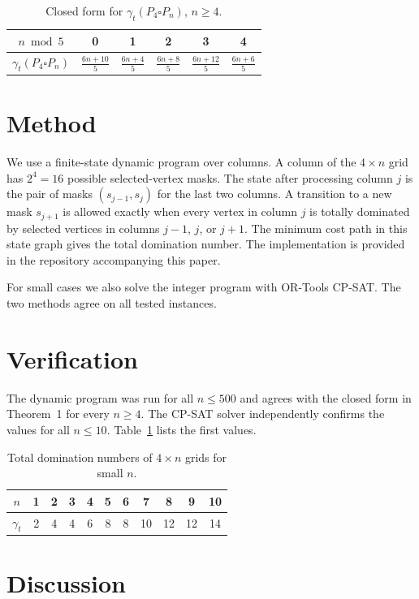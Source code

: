 \documentclass[11pt]{article}
\begin{document}
\begin{table}[h]
\centering
\begin{tabular}{c|c|c|c|c|c}
$n \bmod 5$ & 0 & 1 & 2 & 3 & 4\\
\hline
$\gamma_t(P_4 \square P_n)$ & $\frac{6n+10}{5}$ & $\frac{6n+4}{5}$ & $\frac{6n+8}{5}$ & $\frac{6n+12}{5}$ & $\frac{6n+6}{5}$
\end{tabular}
\caption{Closed form for $\gamma_t(P_4 \square P_n)$, $n \ge 4$.}
\end{table}

\section{Method}

We use a finite-state dynamic program over columns. A column of the $4 \times n$ grid
has $2^4=16$ possible selected-vertex masks. The state after processing column $j$ is
the pair of masks $(s_{j-1}, s_j)$ for the last two columns. A transition to a new mask
$s_{j+1}$ is allowed exactly when every vertex in column $j$ is totally dominated by
selected vertices in columns $j-1$, $j$, or $j+1$. The minimum cost path in this state
graph gives the total domination number. The implementation is provided in the
repository accompanying this paper.

For small cases we also solve the integer program with OR-Tools CP-SAT. The two methods
agree on all tested instances.

\section{Verification}

The dynamic program was run for all $n \le 500$ and agrees with the closed form in
Theorem~1 for every $n \ge 4$. The CP-SAT solver independently confirms the values for
all $n \le 10$. Table~\ref{tab:values} lists the first values.

\begin{table}[h]
\centering
\begin{tabular}{c|cccccccccc}
$n$ & 1 & 2 & 3 & 4 & 5 & 6 & 7 & 8 & 9 & 10\\
\hline
$\gamma_t$ & 2 & 4 & 4 & 6 & 8 & 8 & 10 & 12 & 12 & 14
\end{tabular}
\caption{Total domination numbers of $4 \times n$ grids for small $n$.\label{tab:values}}
\end{table}

\section{Discussion}
\end{document}
